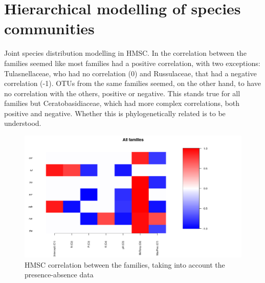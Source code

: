 \chapter{Hierarchical modelling of species communities}
\label{hierarchicalmodellingofspeciescommunities}

Joint species distribution modelling in HMSC. In the correlation between the families seemed like most families had a positive correlation, with two exceptions: Tulasnellaceae, who had no correlation (0) and Russulaceae, that had a negative correlation (-1). OTUs from the same families seemed, on the other hand, to have no correlation with the others, positive or negative. This stands true for all families but Ceratobasidiaceae, which had more complex correlations, both positive and negative. Whether this is phylogenetically related is to be understood.

\begin{figure}[htbp]
\centering
\includegraphics[keepaspectratio,width=\textwidth,height=0.75\textheight]{images/envCorrLump.png}
\caption{HMSC correlation between the families, taking into account the presence-absence data}
\end{figure}

